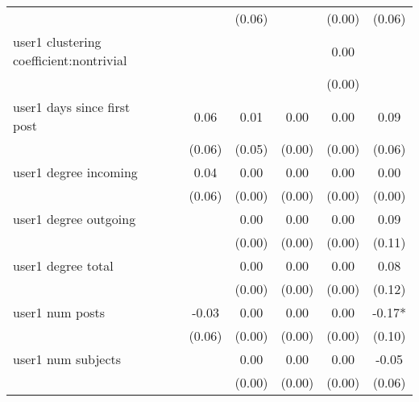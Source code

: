 \begin{table*}
\begin{center}
\begin{tabular}{lccccccc}
                                               &          &            &         & (0.06)  &          & (0.00)             & (0.06)    \\
user1 clustering coefficient:nontrivial        &          &            &         &         &          & 0.00               &           \\
                                               &          &            &         &         &          & (0.00)             &           \\
user1 days since first post                    &          &            & 0.06    & 0.01    & 0.00     & 0.00               & 0.09      \\
                                               &          &            & (0.06)  & (0.05)  & (0.00)   & (0.00)             & (0.06)    \\
user1 degree incoming                          &          &            & 0.04    & 0.00    & 0.00     & 0.00               & 0.00      \\
                                               &          &            & (0.06)  & (0.00)  & (0.00)   & (0.00)             & (0.00)    \\
user1 degree outgoing                          &          &            &         & 0.00    & 0.00     & 0.00               & 0.09      \\
                                               &          &            &         & (0.00)  & (0.00)   & (0.00)             & (0.11)    \\
user1 degree total                             &          &            &         & 0.00    & 0.00     & 0.00               & 0.08      \\
                                               &          &            &         & (0.00)  & (0.00)   & (0.00)             & (0.12)    \\
user1 num posts                                &          &            & -0.03   & 0.00    & 0.00     & 0.00               & -0.17*    \\
                                               &          &            & (0.06)  & (0.00)  & (0.00)   & (0.00)             & (0.10)    \\
user1 num subjects                             &          &            &         & 0.00    & 0.00     & 0.00               & -0.05     \\
                                               &          &            &         & (0.00)  & (0.00)   & (0.00)             & (0.06)    \\

\end{tabular}
\end{center}
\end{table*}
